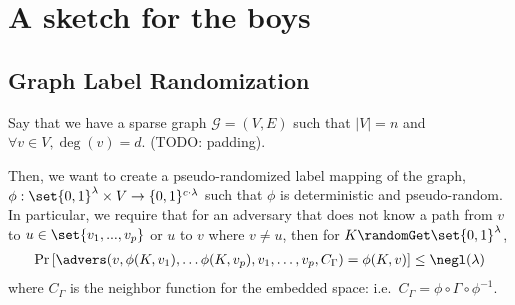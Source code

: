 \section{A sketch for the boys}
\newcommand{\graph}{\mathcal{G}}
\newcommand{\verts}{V}
\newcommand{\inner}{\texttt{inner}}
\newcommand{\edges}{E}
\newcommand{\maxDeg}{d}
\newcommand{\nVerts}{n}
\newcommand{\embedFn}{\phi}
\newcommand{\idealEmbedFn}{\Phi}
\newcommand{\circNeigb}{C_\Gamma}
\newcommand{\PRF}{\texttt{PRF}}
\newcommand{\Hyb}{\texttt{Hyb}}
\newcommand{\adversB}{\mathcal{B}}

\newcommand{\minEntropy}{I_\texttt{min}}

\subsection{Graph Label Randomization}
Say that we have a sparse graph $\graph = (\verts, \edges)$ such that $|\verts| = n$
and $\forall v \in \verts, \deg(v) = d$. (TODO: padding).

Then, we want to create a pseudo-randomized label mapping of the graph, $\embedFn: \set{0, 1}^\lambda \times \verts \rightarrow \{0, 1\}^{c \cdot \lambda}$
such that $\embedFn$ is deterministic and pseudo-random. In particular, we require that for an adversary 
that does not know a path from $v$ to $u \in \set{v_1, ..., v_p}$ or $u$ to $v$ where $v \neq u$, then for $K \randomGet \set{0, 1}^\lambda$,
\begin{align}
	\Pr\left[\advers(v, \embedFn(K, v_1), \dots \embedFn(K, v_{p}), v_1, \dots, v_p, \circNeigb) = \embedFn(K, v)\right]
	\leq \negl(\lambda) 
	\label{eq:gameGRO}
\end{align}
where $\circNeigb$ is the neighbor function for the embedded space: i.e.\ $\circNeigb = \embedFn \circ \Gamma \circ \embedFn^{-1}$.

